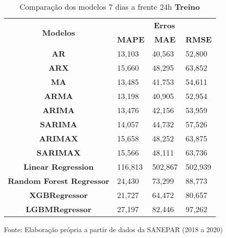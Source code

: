 \begin{table}[H]
	\centering
	\caption{Comparação dos modelos 7 dias a frente 24h \textbf{Treino} }\label{tb:10-24trn}
	\begin{tabular}{@{}clll@{}}
		\toprule
		\multirow{2}{*}{\textbf{Modelos}} & \multicolumn{3}{c}{\textbf{Erros}}                                                                       \\ \cmidrule(l){2-4} 
		& \multicolumn{1}{c}{\textbf{MAPE}} & \multicolumn{1}{c}{\textbf{MAE}} & \multicolumn{1}{c}{\textbf{RMSE}} \\ \hline
\textbf{AR}                       & 13,103                            & 40,563                           & 52,800                            \\
\textbf{ARX}                      & 15,660                            & 48,295                           & 63,852                            \\
\textbf{MA}                       & 13,485                            & 41,753                           & 54,611                            \\
\textbf{ARMA}                     & 13,198                            & 40,905                           & 52,954                            \\
\textbf{ARIMA}                    & 13,476                            & 42,156                           & 53,959                            \\
\textbf{SARIMA}                   & 14,057                            & 44,732                           & 57,526                            \\
\textbf{ARIMAX}                   & 15,658                            & 48,252                           & 63,875                            \\
\textbf{SARIMAX}                  & 15,566                            & 48,111                           & 63,736                            \\
\textbf{Linear Regression}        & 116,813                           & 502,867                          & 502,939                           \\
\textbf{Random Forest Regressor}  & 24,430                            & 73,299                           & 88,773                            \\
\textbf{XGBRegressor}             & 21,727                            & 64,472                           & 80,657                            \\
\textbf{LGBMRegressor}            & 27,197                            & 82,446                           & 97,262                            \\ \bottomrule
	\end{tabular}

Fonte: Elaboração própria a partir de dados da SANEPAR (2018 a 2020)
\end{table}

